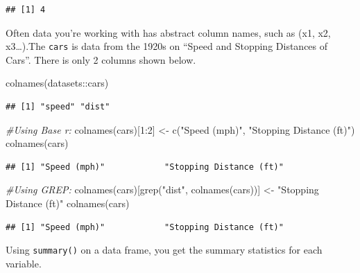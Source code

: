 \documentclass[
]{book}
\newenvironment{Shaded}{\begin{snugshade}}{\end{snugshade}}
\newcommand{\CommentTok}[1]{\textcolor[rgb]{0.56,0.35,0.01}{\textit{#1}}}
\newcommand{\DecValTok}[1]{\textcolor[rgb]{0.00,0.00,0.81}{#1}}
\newcommand{\FunctionTok}[1]{\textcolor[rgb]{0.00,0.00,0.00}{#1}}
\newcommand{\NormalTok}[1]{#1}
\newcommand{\OtherTok}[1]{\textcolor[rgb]{0.56,0.35,0.01}{#1}}
\newcommand{\SpecialCharTok}[1]{\textcolor[rgb]{0.00,0.00,0.00}{#1}}
\newcommand{\StringTok}[1]{\textcolor[rgb]{0.31,0.60,0.02}{#1}}
\begin{document}
\begin{verbatim}
## [1] 4
\end{verbatim}

Often data you're working with has abstract column names, such as (x1, x2, x3\ldots).The \texttt{cars} is data from the 1920s on ``Speed and Stopping Distances of Cars''. There is only 2 columns shown below.

\begin{Shaded}
\begin{Highlighting}[]
\FunctionTok{colnames}\NormalTok{(datasets}\SpecialCharTok{::}\NormalTok{cars)}
\end{Highlighting}
\end{Shaded}

\begin{verbatim}
## [1] "speed" "dist"
\end{verbatim}

\begin{Shaded}
\begin{Highlighting}[]
\CommentTok{\#Using Base r:}
\FunctionTok{colnames}\NormalTok{(cars)[}\DecValTok{1}\SpecialCharTok{:}\DecValTok{2}\NormalTok{] }\OtherTok{\textless{}{-}} \FunctionTok{c}\NormalTok{(}\StringTok{"Speed (mph)"}\NormalTok{, }\StringTok{"Stopping Distance (ft)"}\NormalTok{)}
\FunctionTok{colnames}\NormalTok{(cars)}
\end{Highlighting}
\end{Shaded}

\begin{verbatim}
## [1] "Speed (mph)"            "Stopping Distance (ft)"
\end{verbatim}

\begin{Shaded}
\begin{Highlighting}[]
\CommentTok{\#Using GREP:}
\FunctionTok{colnames}\NormalTok{(cars)[}\FunctionTok{grep}\NormalTok{(}\StringTok{"dist"}\NormalTok{, }\FunctionTok{colnames}\NormalTok{(cars))] }\OtherTok{\textless{}{-}} \StringTok{"Stopping Distance (ft)"}
\FunctionTok{colnames}\NormalTok{(cars)}
\end{Highlighting}
\end{Shaded}

\begin{verbatim}
## [1] "Speed (mph)"            "Stopping Distance (ft)"
\end{verbatim}

Using \texttt{summary()} on a data frame, you get the summary statistics for each variable.
\end{document}
